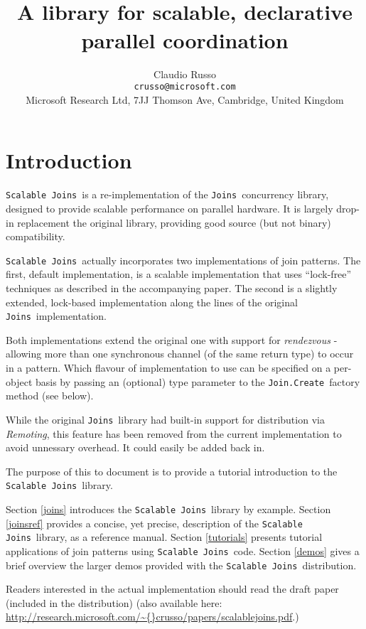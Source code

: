 \documentclass{article}
\title{\sjoins\ \\
       A library for scalable, declarative parallel coordination}
\author{Claudio Russo
\\{\makeatother \texttt{crusso@microsoft.com}}
\\    Microsoft Research Ltd, 7JJ Thomson Ave, Cambridge, United Kingdom}
\newcommand{\comega}{\texorpdfstring{\mbox{C$\omega$}}{C{omega}}}
\newcommand{\csharp}{\texorpdfstring{\mbox{C$^\#$}}{C\#}}
\newcommand{\sjoins}{{\texttt{Scalable Joins}}}
\newcommand{\joins}{{\texttt{Joins}}}
\newcommand{\joindotcreate}{\texttt{Join.Create}}
\begin{document}
\maketitle

\section{Introduction}

\sjoins\ is a re-implementation of the \joins\ concurrency library, designed to provide scalable performance on parallel hardware.
It is largely drop-in replacement the original library, providing good source (but not binary) compatibility.

\sjoins\ actually incorporates two implementations of join patterns. The first, default implementation, is a 
scalable implementation that uses ``lock-free'' techniques as described in the accompanying paper.
The second is a slightly extended, lock-based implementation along the lines of the original \joins\ implementation.

Both implementations extend the original one with support for \emph{rendezvous} - allowing more than one synchronous channel (of the same return type) to occur in a pattern.
Which flavour of implementation to use can be specified on a per-object basis by passing an (optional) type parameter to the \joindotcreate\ factory method (see below).

While the original \joins\ library had built-in support for distribution via \emph{Remoting}, this feature has been
removed from the current implementation to avoid unnessary overhead. It could easily be added back in.

The purpose of this to document is to provide a tutorial introduction to the \sjoins\ library. 

Section \ref{joins} introduces the \sjoins\ library by example.
Section \ref{joinsref} provides a concise, yet precise, description of the \sjoins\ library, as a reference manual.
Section \ref{tutorials} presents tutorial applications of join patterns using \sjoins\ code.
Section \ref{demos} gives a brief overview the larger demos provided with the \sjoins\ distribution.

Readers interested in the actual implementation should read the draft paper (included in the distribution) 
(also available here: \url{http://research.microsoft.com/~{}crusso/papers/scalablejoins.pdf}.)
\end{document}
